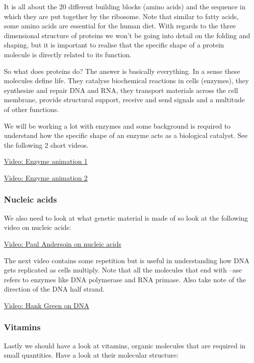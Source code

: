 \documentclass[11pt]{article}
\begin{document}
It is all about the 20 different building blocks (amino acids) and the
sequence in which they are put together by the ribosome. Note that
similar to fatty acids, some amino acids are essential for the human
diet. With regards to the three dimensional structure of proteins we
won't be going into detail on the folding and shaping, but it is
important to realise that the specific shape of a protein molecule is
directly related to its function.

So what does proteins do? The answer is basically everything. In a sense
these molecules define life. They catalyse biochemical reactions in
cells (enzymes), they synthesize and repair DNA and RNA, they transport
materials across the cell membrane, provide structural support, receive
and send signals and a multitude of other functions.

We will be working a lot with enzymes and some background is required to
understand how the specific shape of an enzyme acts as a biological
catalyst. See the following 2 short videos.

\href{https://www.youtube.com/watch?v=aRSfPLp_I10}{Video: Enzyme
animation 1}

\href{https://www.youtube.com/watch?v=E2UNc5zBejc}{Video: Enzyme
animation 2}

\subsubsection{Nucleic acids}\label{nucleic-acids}

We also need to look at what genetic material is made of so look at the
following video on nucleic acids:

\href{https://www.youtube.com/watch?v=NNASRkIU5Fw}{Video: Paul Andersoin
on nucleic acids}

The next video contains some repetition but is useful in understanding
how DNA gets replicated as cells multiply. Note that all the molecules
that end with --ase refers to enzymes like DNA polymerase and RNA
primase. Also take note of the direction of the DNA half strand.

\href{https://www.youtube.com/watch?v=8kK2zwjRV0M}{Video: Hank Green on
DNA}

\subsubsection{Vitamins}\label{vitamins}

Lastly we should have a look at vitamins, organic molecules that are
required in small quantities. Have a look at their molecular structure:
\end{document}
